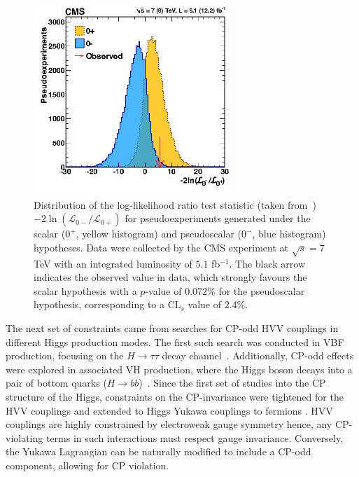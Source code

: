 \begin{figure}[h]
\centering
\includegraphics[width= 0.67\textwidth]{Figures/Chapter2/SpinParity.png}
\caption[Log-likelihood ratio test statistic for scalar vs pseudoscalar hypotheses]{Distribution of the log-likelihood ratio test statistic (taken from~\cite{CP_constraints_2}) $-2\ln(\mathcal{L}_{0-}/\mathcal{L}_{0+})$ for pseudoexperiments generated under the scalar ($0^+$, yellow histogram) and pseudoscalar ($0^-$, blue histogram) hypotheses. Data were collected by the CMS experiment at $\sqrt{s} = 7$ TeV with an integrated luminosity of $5.1$ fb$^{-1}$. The black arrow indicates the observed value in data, which strongly favours the scalar hypothesis with a $p$-value of $0.072\%$ for the pseudoscalar hypothesis, corresponding to a $\text{CL}_s$ value of $2.4\%$.}\label{Figure:Chapter2_CPevenVsCPodd}
\end{figure}

The next set of constraints came from searches for CP-odd 
HVV couplings in different Higgs production modes. The first such search was conducted in VBF production, focusing on the 
$H\to\tau\tau$ decay channel~\cite{CP_constraints_4}. Additionally, CP-odd effects were explored in associated VH production, where the Higgs boson decays into a pair of bottom quarks ($H\to bb$)~\cite{CP_constraints_5}. Since the first set of studies into the CP structure of the Higgs, constraints on the CP-invariance were tightened for the HVV couplings and extended to Higgs Yukawa couplings to fermions \cite{CP_constraints_6,CP_constraints_7,CP_constraints_8,CP_constraints_9,CP_constraints_10,CP_constraints_11,CP_constraints_12,CP_constraints_13,CP_constraints_14,CP_constraints_15,CP_constraints_16,CP_constraints_17,CP_constraints_18,CP_constraints_19,CP_constraints_20,CP_constraints_21,CP_constraints_22}. HVV couplings are highly constrained by electroweak gauge symmetry hence, any CP-violating terms in such interactions must respect gauge invariance. Conversely, the Yukawa Lagrangian can be naturally modified to include a CP-odd component, allowing for CP violation.
\newpage

